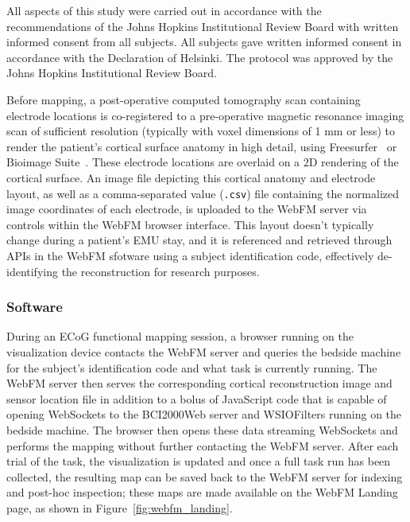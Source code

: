\documentclass[utf8]{frontiersSCNS}
\begin{document}
All aspects of this study were carried out in accordance with the recommendations of the Johns Hopkins Institutional Review Board with written informed consent from all subjects. All subjects gave written informed consent in accordance with the Declaration of Helsinki. The protocol was approved by the Johns Hopkins Institutional Review Board.

Before mapping, a post-operative computed tomography scan containing electrode locations is co-registered to a pre-operative magnetic resonance imaging scan of sufficient resolution (typically with voxel dimensions of 1 mm or less) to render the patient's cortical surface anatomy in high detail, using Freesurfer~\citep{fischl_freesurfer_2012} or Bioimage Suite~\citep{papademetris_bioimage_2006}.
These electrode locations are overlaid on a 2D rendering of the cortical surface.
An image file depicting this cortical anatomy and electrode layout, as well as a comma-separated value (\texttt{.csv}) file containing the normalized image coordinates of each electrode, is uploaded to the WebFM server via controls within the WebFM browser interface.
This layout doesn't typically change during a patient's EMU stay, and it is referenced and retrieved through APIs in the WebFM sfotware using a subject identification code, effectively de-identifying the reconstruction for research purposes.

\subsubsection{Software}

During an ECoG functional mapping session, a browser running on the visualization device contacts the WebFM server and queries the bedside machine for the subject's identification code and what task is currently running.
The WebFM server then serves the corresponding cortical reconstruction image and sensor location file in addition to a bolus of JavaScript code that is capable of opening WebSockets to the BCI2000Web server and WSIOFilters running on the bedside machine.
The browser then opens these data streaming WebSockets and performs the mapping without further contacting the WebFM server.
After each trial of the task, the visualization is updated and once a full task run has been collected, the resulting map can be saved back to the WebFM server for indexing and post-hoc inspection; these maps are made available on the WebFM Landing page, as shown in Figure~\ref{fig:webfm_landing}.
\end{document}
